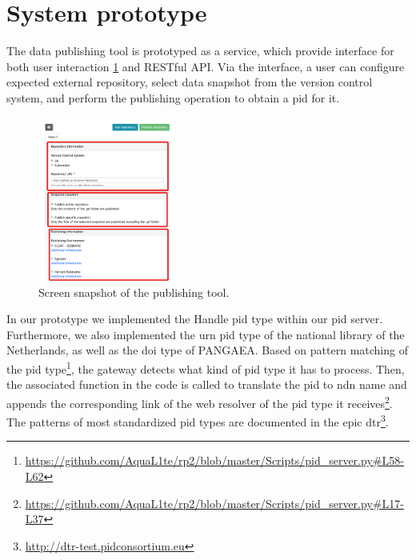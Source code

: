 \documentclass[conference]{IEEEtran}
\begin{document}
\section{System prototype}
\label{ndn-planning-deployment}
The data publishing tool is prototyped as a service, which provide interface for both user interaction \ref{fig:publishingagent} and RESTful API. Via the interface, a user can configure expected external repository, select data snapshot from the version control system, and perform the publishing operation to obtain a \gls{pid} for it. 
\begin{figure}
\centering
\includegraphics[width=0.4\textwidth]{images/publishingagent.png}
\caption{Screen snapshot of the publishing tool.}
\label{fig:publishingagent}
\end{figure}

In our prototype we implemented the Handle \gls{pid} type within our \gls{pid} server. Furthermore, we also implemented the \gls{urn} \gls{pid} type of the national library of the Netherlands, as well as the \gls{doi} type of PANGAEA. Based on pattern matching of the \gls{pid} type\footnote{\url{https://github.com/AquaL1te/rp2/blob/master/Scripts/pid_server.py#L58-L62}}, the gateway detects what kind of \gls{pid} type it has to process. Then, the associated function in the code is called to translate the \gls{pid} to \gls{ndn} name and appends the corresponding link of the web resolver of the \gls{pid} type it receives\footnote{\url{https://github.com/AquaL1te/rp2/blob/master/Scripts/pid_server.py#L17-L37}}. The patterns of most standardized \gls{pid} types are documented in the \gls{epic} \gls{dtr}\footnote{\url{http://dtr-test.pidconsortium.eu}}.


 
\end{document}
